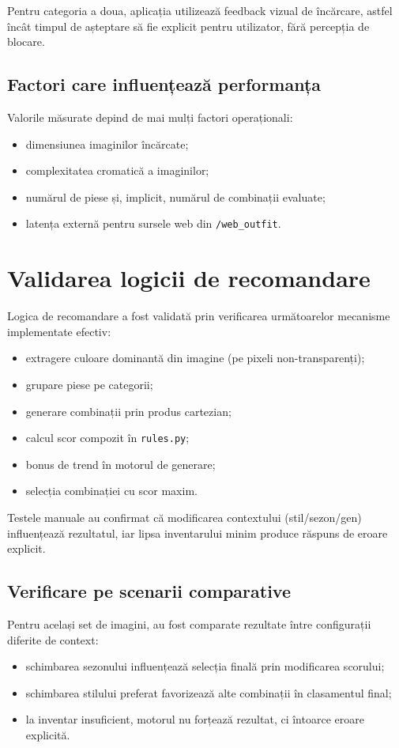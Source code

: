 Pentru categoria a doua, aplicația utilizează feedback vizual de încărcare, astfel încât timpul de așteptare să fie explicit pentru utilizator, fără percepția de blocare.

\subsection{Factori care influențează performanța}
Valorile măsurate depind de mai mulți factori operaționali:
\begin{itemize}
    \item dimensiunea imaginilor încărcate;
    \item complexitatea cromatică a imaginilor;
    \item numărul de piese și, implicit, numărul de combinații evaluate;
    \item latența externă pentru sursele web din \texttt{/web\_outfit}.
\end{itemize}

\section{Validarea logicii de recomandare}
Logica de recomandare a fost validată prin verificarea următoarelor mecanisme implementate efectiv:
\begin{itemize}
    \item extragere culoare dominantă din imagine (pe pixeli non-transparenți);
    \item grupare piese pe categorii;
    \item generare combinații prin produs cartezian;
    \item calcul scor compozit în \texttt{rules.py};
    \item bonus de trend în motorul de generare;
    \item selecția combinației cu scor maxim.
\end{itemize}

Testele manuale au confirmat că modificarea contextului (stil/sezon/gen) influențează rezultatul, iar lipsa inventarului minim produce răspuns de eroare explicit.

\subsection{Verificare pe scenarii comparative}
Pentru același set de imagini, au fost comparate rezultate între configurații diferite de context:
\begin{itemize}
    \item schimbarea sezonului influențează selecția finală prin modificarea scorului;
    \item schimbarea stilului preferat favorizează alte combinații în clasamentul final;
    \item la inventar insuficient, motorul nu forțează rezultat, ci întoarce eroare explicită.
\end{itemize}

